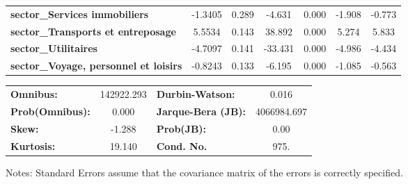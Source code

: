 \begin{center}
\begin{tabular}{lcccccc}
\textbf{sector\_Services immobiliers}                                 &      -1.3405  &        0.289     &    -4.631  &         0.000        &       -1.908    &       -0.773     \\
\textbf{sector\_Transports et entreposage}                            &       5.5534  &        0.143     &    38.892  &         0.000        &        5.274    &        5.833     \\
\textbf{sector\_Utilitaires}                                          &      -4.7097  &        0.141     &   -33.431  &         0.000        &       -4.986    &       -4.434     \\
\textbf{sector\_Voyage, personnel et loisirs}                         &      -0.8243  &        0.133     &    -6.195  &         0.000        &       -1.085    &       -0.563     \\
\bottomrule
\end{tabular}
\begin{tabular}{lclc}
\textbf{Omnibus:}       & 142922.293 & \textbf{  Durbin-Watson:     } &      0.016   \\
\textbf{Prob(Omnibus):} &    0.000   & \textbf{  Jarque-Bera (JB):  } & 4066984.697  \\
\textbf{Skew:}          &   -1.288   & \textbf{  Prob(JB):          } &       0.00   \\
\textbf{Kurtosis:}      &   19.140   & \textbf{  Cond. No.          } &       975.   \\
\bottomrule
\end{tabular}
\end{center}

Notes: \newline
 [1] Standard Errors assume that the covariance matrix of the errors is correctly specified.